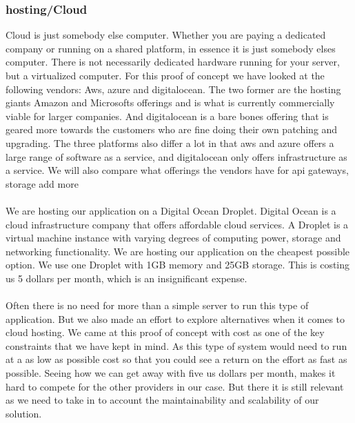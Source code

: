 \documentclass[]{uiophd}
\begin{document}
\subsubsection{hosting/Cloud}
Cloud is just somebody else computer. Whether you are paying a dedicated company or running on a shared platform, in essence it is just somebody elses computer. There is not necessarily dedicated hardware running for your server, but a virtualized computer. For this proof of concept we have looked at the following vendors: Aws, azure and digitalocean. The two former are the hosting giants Amazon and Microsofts offerings and is what is currently commercially viable for larger companies. And digitalocean is a bare bones offering that is geared more towards the customers who are fine doing their own patching and upgrading. The three platforms also differ a lot in that aws and azure offers a large range of software as a service, and digitalocean only offers infrastructure as a service. We will also compare what offerings the vendors have for api gateways, storage {add more}
\\\\
We are hosting our application on a Digital Ocean Droplet. Digital Ocean is a cloud infrastructure company that offers affordable cloud services. A Droplet is a virtual machine instance with varying degrees of computing power, storage and networking functionality. We are hosting our application on the cheapest possible option. We use one Droplet with 1GB memory and 25GB storage. This is costing us 5 dollars per month, which is an insignificant expense. 
\\\\
Often there is no need for more than a simple server to run this type of application. But we also made an effort to explore alternatives when it comes to cloud hosting. We came at this proof of concept with cost as one of the key constraints that we have kept in mind. As this type of system would need to run at a as low as possible cost so that you could see a return on the effort as fast as possible. Seeing how we can get away with five us dollars per month, makes it hard to compete for the other providers in our case. But there it is still relevant as we need to take in to account the maintainability and scalability of our solution.
\end{document}
